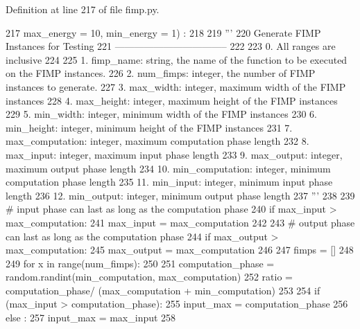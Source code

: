 Definition at line 217 of file fimp.\+py.


\begin{DoxyCode}
217     max\_energy = 10, min\_energy = 1) :
218 
219     \textcolor{stringliteral}{'''}
220 \textcolor{stringliteral}{      Generate FIMP Instances for Testing}
221 \textcolor{stringliteral}{      -----------------------------------}
222 \textcolor{stringliteral}{}
223 \textcolor{stringliteral}{      0. All ranges are inclusive}
224 \textcolor{stringliteral}{}
225 \textcolor{stringliteral}{      1. fimp\_name: string, the name of the function to be executed on the FIMP instances.}
226 \textcolor{stringliteral}{      2. num\_fimps: integer, the number of FIMP instances to generate.}
227 \textcolor{stringliteral}{      3. max\_width: integer, maximum width of the FIMP instances}
228 \textcolor{stringliteral}{      4. max\_height: integer, maximum height of the FIMP instances}
229 \textcolor{stringliteral}{      5. min\_width: integer, minimum width of the FIMP instances}
230 \textcolor{stringliteral}{      6. min\_height: integer, minimum height of the FIMP instances}
231 \textcolor{stringliteral}{      7. max\_computation: integer, maximum computation phase length}
232 \textcolor{stringliteral}{      8. max\_input: integer, maximum input phase length}
233 \textcolor{stringliteral}{      9. max\_output: integer, maximum output phase length}
234 \textcolor{stringliteral}{      10. min\_computation: integer, minimum computation phase length}
235 \textcolor{stringliteral}{      11. min\_input: integer, minimum input phase length}
236 \textcolor{stringliteral}{      12. min\_output: integer, minimum output phase length}
237 \textcolor{stringliteral}{    '''}
238 
239     \textcolor{comment}{# input phase can last as long as the computation phase}
240     \textcolor{keywordflow}{if} max\_input > max\_computation:
241       max\_input = max\_computation
242 
243     \textcolor{comment}{# output phase can last as long as the computation phase}
244     \textcolor{keywordflow}{if} max\_output > max\_computation:
245       max\_output = max\_computation
246 
247     fimps = []
248 
249     \textcolor{keywordflow}{for} x \textcolor{keywordflow}{in} range(num\_fimps):
250 
251       computation\_phase = random.randint(min\_computation, max\_computation)
252       ratio = computation\_phase/ (max\_computation + min\_computation)
253 
254       \textcolor{keywordflow}{if} (max\_input > computation\_phase):
255         input\_max = computation\_phase
256       \textcolor{keywordflow}{else} :
257         input\_max = max\_input
258 

\end{DoxyCode}
